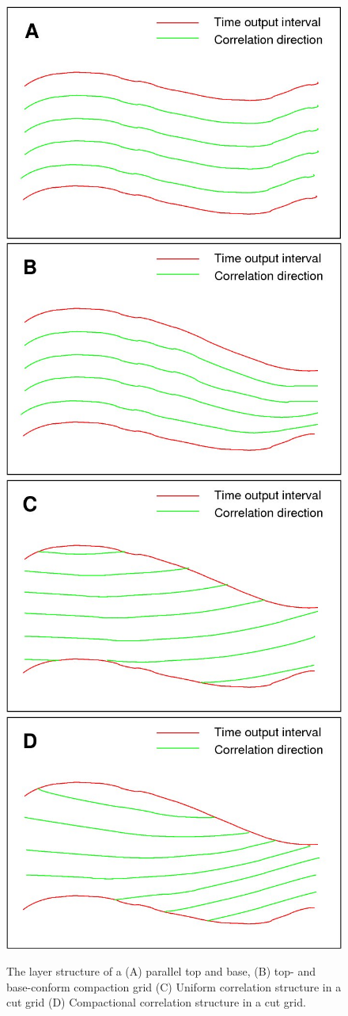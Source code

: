 \begin{figure}
  \includegraphics[width=.49\linewidth]{images/A_correlation_parallel}
  \includegraphics[width=.49\linewidth]{images/B_correlation_proportional}\\
  \includegraphics[width=.49\linewidth]{images/C_correlation_parallel_timecut}
  \includegraphics[width=.49\linewidth]{images/D_correlation_proportional_timecut}
  \caption{The layer structure of a (A) parallel top and base,
           (B) top- and base-conform compaction grid (C) Uniform correlation
           structure in a cut grid (D) Compactional correlation structure in a
           cut grid.} 
  \label{fig:inversion-interval-types}
\end{figure}

